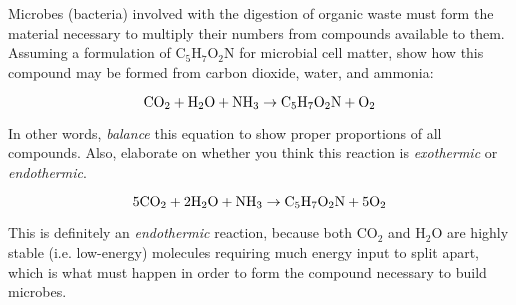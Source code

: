 

Microbes (bacteria) involved with the digestion of organic waste must form the material necessary to multiply their numbers from compounds available to them.  Assuming a formulation of C$_{5}$H$_{7}$O$_{2}$N for microbial cell matter, show how this compound may be formed from carbon dioxide, water, and ammonia:

$$\hbox{CO}_2 + \hbox{H}_2\hbox{O} + \hbox{NH}_3 \to \hbox{C}_5 \hbox{H}_7 \hbox{O}_2 \hbox{N} + \hbox{O}_2$$

In other words, {\it balance} this equation to show proper proportions of all compounds.  Also, elaborate on whether you think this reaction is {\it exothermic} or {\it endothermic}.







$$5\hbox{CO}_2 + 2\hbox{H}_2\hbox{O} + \hbox{NH}_3 \to \hbox{C}_5 \hbox{H}_7 \hbox{O}_2 \hbox{N} + 5\hbox{O}_2$$

This is definitely an {\it endothermic} reaction, because both CO$_{2}$ and H$_{2}$O are highly stable (i.e. low-energy) molecules requiring much energy input to split apart, which is what must happen in order to form the compound necessary to build microbes.











